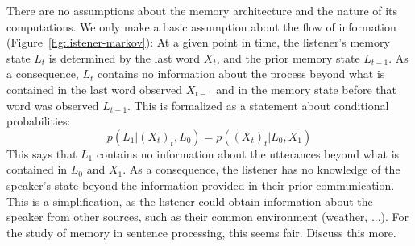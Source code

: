 \documentclass[11pt,letterpaper]{article}
\begin{document}
There are no assumptions about the memory architecture and the nature of its computations.
We only make a basic assumption about the flow of information (Figure~\ref{fig:listener-markov}):
At a given point in time, the listener's memory state $L_t$ is determined by the last word $X_t$, and the prior memory state $L_{t-1}$.
As a consequence, $L_t$ contains no information about the process beyond what is contained in the last word observed $X_{t-1}$ and in the memory state before that word was observed $L_{t-1}$.
This is formalized as a statement about conditional probabilities:
	\begin{equation}\label{eq:listener-markov}
p(L_1| (X_{t})_t, L_0)   = p((X_{t})_t| L_0, X_1)
	\end{equation}
This says that $L_1$ contains no information about the utterances beyond what is contained in $L_0$ and $X_1$.	
As a consequence, the listener has no knowledge of the speaker's state beyond the information provided in their prior communication.
This is a simplification, as the listener could obtain information about the speaker from other sources, such as their common environment (weather, ...).
For the study of memory in sentence processing, this seems fair. Discuss this more.

%
%

\end{document}
